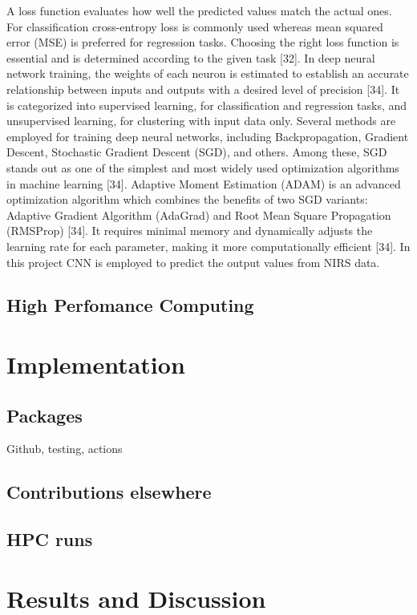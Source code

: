 \documentclass[12pt,a4paper]{report}
\begin{document}
A loss function evaluates how well the predicted values match the actual ones.  For classification cross-entropy loss is commonly used whereas mean squared error (MSE) is preferred for regression tasks. Choosing the right loss function is essential and is determined according to the given task [32]. In deep neural network training, the weights of each neuron is estimated to establish an accurate relationship between inputs and outputs with a desired level of precision [34].
It is categorized into supervised learning, for classification and regression tasks, and unsupervised learning, for clustering with input data only. Several methods are employed for training deep neural networks, including Backpropagation, Gradient Descent, Stochastic Gradient Descent (SGD), and others. Among these, SGD stands out as one of the simplest and most widely used optimization algorithms in machine learning [34]. Adaptive Moment Estimation (ADAM) is an advanced 
optimization algorithm which combines the benefits of two SGD variants: Adaptive Gradient Algorithm (AdaGrad) and Root Mean Square Propagation (RMSProp) [34]. It requires minimal memory and dynamically adjusts the learning rate for each parameter, making it more computationally efficient [34]. In this project CNN is employed to predict the output values from NIRS data. \\

\section{High Perfomance Computing}


\chapter{Implementation}
\section{Packages}
Github, testing, actions
\section{Contributions elsewhere}
\section{HPC runs}


\chapter{Results and Discussion}
\end{document}
